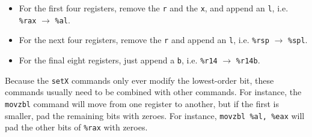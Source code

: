 \documentclass[class=article, crop=false]{standalone}
\begin{document}
  \begin{itemize}
    \item For the first four registers, remove the \texttt{r} and the \texttt{x}, and append an \texttt{l}, i.e. \texttt{\%rax} $\to$ \texttt{\%al}.
    \item For the next four registers, remove the \texttt{r} and append an \texttt{l}, i.e. \texttt{\%rsp} $\to$ \texttt{\%spl}.
    \item For the final eight registers, just append a \texttt{b}, i.e. \texttt{\%r14} $\to$ \texttt{\%r14b}.
  \end{itemize}
  Because the \texttt{setX} commands only ever modify the lowest-order bit, these commands usually need to be combined with other commands. For instance, the \texttt{movzbl} command will move from one register to another, but if the first is smaller, pad the remaining bits with zeroes. For instance, \texttt{movzbl \%al, \%eax} will pad the other bits of \texttt{\%rax} with zeroes.
\end{document}
